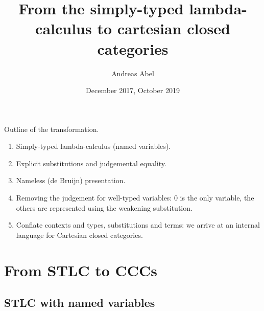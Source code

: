 \documentclass[a4paper,fleqn]{scrartcl}
\title{From the simply-typed lambda-calculus to
  cartesian closed categories}
\author{Andreas Abel}
\date{December 2017, October 2019}
\begin{document}
\maketitle

Outline of the transformation.
\begin{enumerate}
\item Simply-typed lambda-calculus (named variables).
\item Explicit substitutions and judgemental equality.
\item Nameless (de Bruijn) presentation.
\item Removing the judgement for well-typed variables: $0$ is the only
  variable, the others are represented using the weakening
  substitution.
\item Conflate contexts and types, substitutions and terms: we arrive
  at an internal language for Cartesian closed categories.
\end{enumerate}

\section{From STLC to CCCs}

\subsection{STLC with named variables}
\end{document}
